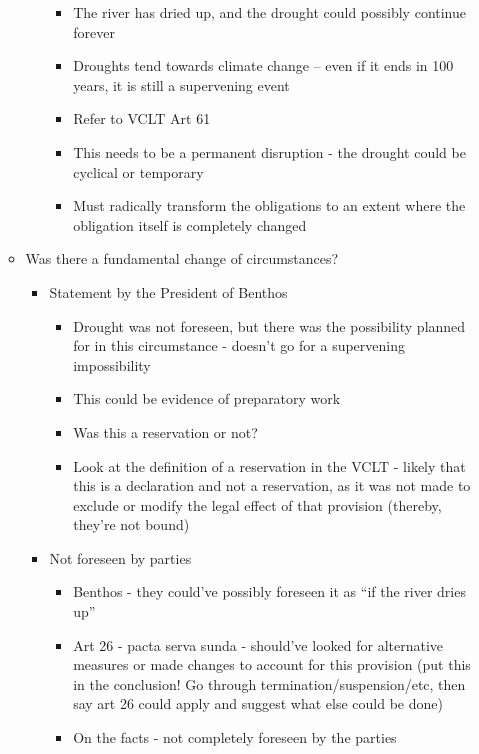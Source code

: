 \begin{itemize}
\begin{itemize}
\begin{itemize}
            \begin{itemize}
                \item The river has dried up, and the drought could possibly continue forever
                \item Droughts tend towards climate change -- even if it ends in 100 years, it is still a supervening event
                \item Refer to VCLT Art 61
                \item This needs to be a permanent disruption - the drought could be cyclical or temporary
                \item Must radically transform the obligations to an extent where the obligation itself is completely changed                
            \end{itemize}
        \end{itemize}
        \item Was there a fundamental change of circumstances?
        \begin{itemize}
            \item Statement by the President of Benthos
            \begin{itemize}
                \item Drought was not foreseen, but there was the possibility planned for in this circumstance - doesn't go for a supervening impossibility
                \item This could be evidence of preparatory work
                \item Was this a reservation or not?
                \item Look at the definition of a reservation in the VCLT - likely that this is a declaration and not a reservation, as it was not made to exclude or modify the legal effect of that provision (thereby, they're not bound)
            \end{itemize}
            \item Not foreseen by parties
            \begin{itemize}
                \item Benthos - they could've possibly foreseen it as “if the river dries up”
                \item Art 26 - pacta serva sunda - should've looked for alternative measures or made changes to account for this provision (put this in the conclusion! Go through termination/suspension/etc, then say art 26 could apply and suggest what else could be done)
                \item On the facts - not completely foreseen by the parties                

\end{itemize}
\end{itemize}
\end{itemize}
\end{itemize}
